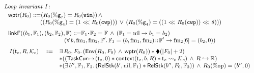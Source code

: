 \begin{figure}[!thp]
    \centering
    \[
        \small
        \begin{array}{l}
            \textit{Loop invariant I}: \\
            \\[-9pt] \ \ 
            \wptr(\RFile_0) \define 
            (\RFile_0(\greg{7}) = \RFile_0(\regwim)) \, \land \, \\
            \hspace*{6em} 
            ((\RFile_0(\greg{4}) = (1 <\!\!< \RFile_0(\regcwp))) \, \lor \, 
                (\RFile_0(\greg{4}) = ((1 <\!\!< \RFile_0(\regcwp)) <\!\!< 8))) \\
            \\[-5pt] \ \ 
            \linkF((\block_1, \hWstk_1), (\block_2, \hWstk_2), \hWstk) \define 
            \hWstk_1 \lstApp \hWstk_2 = \hWstk \, \land \, 
            (\hWstk_1 = \nil \rightarrow \block_1 = \block_2) \\
            \hspace*{10em}
            (\forall \, \block, \fm_1, \fm_2, \hWstk'. \, 
                \hWstk_1 = (\block, \fm_1, \fm_2) \stCons \hWstk' \rightarrow
                \fm_2[6] = (\block_2, 0)
            )
            \\
            \\[-5pt]
            \begin{array}{lcl} \ 
                I(\thrdid_c, \RFile, \hthrdlocalst_c) & \define & 
                \exists \, \RFile_0, \Wstack_0. \, 
                (\Env{\RFile_0, \Wstack_0} \, \land \, 
                \wptr(\RFile_0)) \sepstar 
                \metricAst{|\Wstack_0| + 2} \\
                & & 
                \sepstar
                (
                (
                    \msto{\TaskCur}{(\thrdid_c, 0)} \sepstar 
                    \relcontext{\thrdid_c}{\block}{\RFile} \sepstar 
                    \astCurCont{\thrdid_c}{\hthrdlocalst_c}
                ) 
                \, \land \, \Rinj{\RFile}{\hRfile}) \\
                & & \sepstar
                (
                    \exists \, \block'', \hWstk_1, \hWstk_2. \, 
                    (\RelStk{\block'}{\nil}{\hWstk_1} \sepstar 
                        \RelStk{\block''}{\Wstack_0}{\hWstk_2}) \,
                    \land \, 
                    \RFile_0(\spreg) = (\block'', 0) \\

\end{array}
\end{array}\]
\end{figure}
